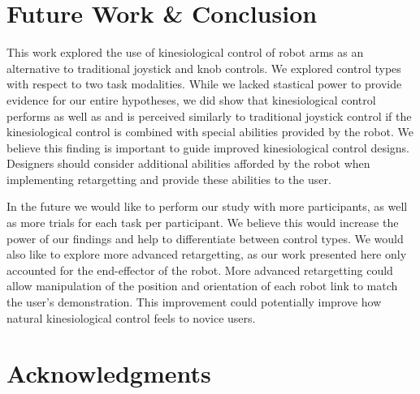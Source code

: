 \documentclass{sigchi}
\newcommand\tabhead[1]{\small\textbf{#1}}
\begin{document}
\section{Future Work \& Conclusion}
This work explored the use of kinesiological control of robot arms as an alternative to traditional joystick and knob controls. We explored control types with respect to two task modalities. While we lacked stastical power to provide evidence for our entire hypotheses, we did show that kinesiological control performs as well as and is perceived similarly to traditional joystick control if the kinesiological control is combined with special abilities provided by the robot. We believe this finding is important to guide improved kinesiological control designs. Designers should consider additional abilities afforded by the robot when implementing retargetting and provide these abilities to the user.

In the future we would like to perform our study with more participants, as well as more trials for each task per participant. We believe this would increase the power of our findings and help to differentiate between control types. We would also like to explore more advanced retargetting, as our work presented here only accounted for the end-effector of the robot. More advanced retargetting could allow manipulation of the position and orientation of each robot link to match the user's demonstration. This improvement could potentially improve how natural kinesiological control feels to novice users.


\section{Acknowledgments}
\end{document}

